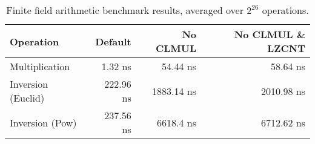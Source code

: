 \begin{table}[hbt]
\centering
\begin{tabular}{lrrr}
\toprule
\textbf{Operation} & \textbf{Default} & \textbf{No CLMUL} & \textbf{No CLMUL \& LZCNT} \\
\midrule
Multiplication     & 1.32 ns & 54.44 ns & 58.64 ns \\
Inversion (Euclid) & 222.96 ns & 1883.14 ns & 2010.98 ns \\
Inversion (Pow)    & 237.56 ns & 6618.4 ns & 6712.62 ns \\
\bottomrule
\end{tabular}
\caption{Finite field arithmetic benchmark results, averaged over $2^{26}$ operations.}
\label{tab:arithmetic_benchmark}
\end{table}
